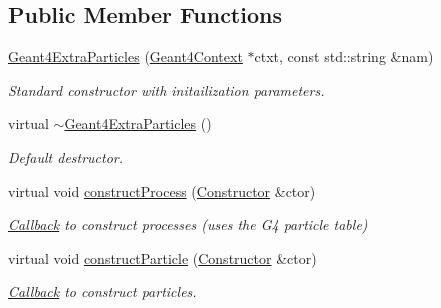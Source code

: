 \subsection*{Public Member Functions}
\begin{DoxyCompactItemize}
\item 
\hyperlink{class_d_d4hep_1_1_simulation_1_1_geant4_extra_particles_a6010ec49bacd3f02f24ee026fe0aac3f}{Geant4\+Extra\+Particles} (\hyperlink{class_d_d4hep_1_1_simulation_1_1_geant4_context}{Geant4\+Context} $\ast$ctxt, const std\+::string \&nam)
\begin{DoxyCompactList}\small\item\em Standard constructor with initailization parameters. \end{DoxyCompactList}\item 
virtual \hyperlink{class_d_d4hep_1_1_simulation_1_1_geant4_extra_particles_aca6485d81b22fb87183c62b06da3df17}{$\sim$\+Geant4\+Extra\+Particles} ()
\begin{DoxyCompactList}\small\item\em Default destructor. \end{DoxyCompactList}\item 
virtual void \hyperlink{class_d_d4hep_1_1_simulation_1_1_geant4_extra_particles_aa87e3c12da9259e49a15a35a5c76698c}{construct\+Process} (\hyperlink{class_d_d4hep_1_1_simulation_1_1_geant4_physics_constructor_1_1_constructor}{Constructor} \&ctor)
\begin{DoxyCompactList}\small\item\em \hyperlink{class_d_d4hep_1_1_callback}{Callback} to construct processes (uses the G4 particle table) \end{DoxyCompactList}\item 
virtual void \hyperlink{class_d_d4hep_1_1_simulation_1_1_geant4_extra_particles_ad256c3419ba5c43c223157434f74ae49}{construct\+Particle} (\hyperlink{class_d_d4hep_1_1_simulation_1_1_geant4_physics_constructor_1_1_constructor}{Constructor} \&ctor)
\begin{DoxyCompactList}\small\item\em \hyperlink{class_d_d4hep_1_1_callback}{Callback} to construct particles. \end{DoxyCompactList}\end{DoxyCompactItemize}
